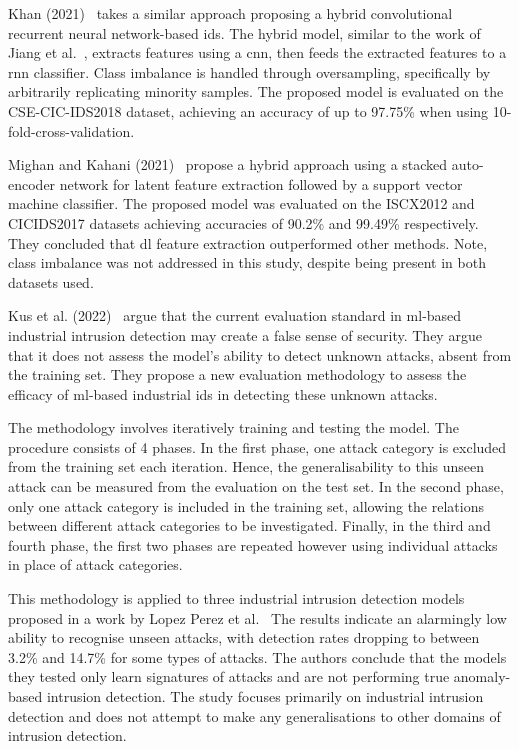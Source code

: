 Khan (2021)~\cite{Khan} takes a similar approach proposing a hybrid
convolutional recurrent neural network-based \gls{ids}. The hybrid model,
similar to the work of Jiang et al.~\cite{Jiang}, extracts features using a
\gls{cnn}, then feeds the extracted features to a \gls{rnn} classifier. Class
imbalance is handled through oversampling, specifically by arbitrarily
replicating minority samples. The proposed model is evaluated on the
CSE-CIC-IDS2018 dataset, achieving an accuracy of up to 97.75\% when using
10-fold-cross-validation.

Mighan and Kahani (2021)~\cite{Mighan} propose a hybrid approach using a
stacked auto-encoder network for latent feature extraction followed by a
support vector machine classifier. The proposed model was evaluated on the
ISCX2012 and CICIDS2017 datasets achieving accuracies of 90.2\% and 99.49\%
respectively. They concluded that \gls{dl} feature extraction outperformed
other methods. Note, class imbalance was not addressed in this study, despite
being present in both datasets used.

Kus et al. (2022)~\cite{Kus} argue that the current evaluation standard in
\gls{ml}-based industrial intrusion detection may create a false sense of
security. They argue that it does not assess the model's ability to detect
unknown attacks, absent from the training set. They propose a new evaluation
methodology to assess the efficacy of \gls{ml}-based industrial \gls{ids} in
detecting these unknown attacks.

The methodology involves iteratively training and testing the model. The
procedure consists of 4 phases. In the first phase, one attack category is
excluded from the training set each iteration. Hence, the generalisability to
this unseen attack can be measured from the evaluation on the test set. In the
second phase, only one attack category is included in the training set,
allowing the relations between different attack categories to be investigated.
Finally, in the third and fourth phase, the first two phases are repeated
however using individual attacks in place of attack categories.

This methodology is applied to three industrial intrusion detection models
proposed in a work by Lopez Perez et al.~\cite{Perez} The results indicate an
alarmingly low ability to recognise unseen attacks, with detection rates
dropping to between 3.2\% and 14.7\% for some types of attacks. The authors
conclude that the models they tested only learn signatures of attacks and are
not performing true anomaly-based intrusion detection. The study focuses
primarily on industrial intrusion detection and does not attempt to make any
generalisations to other domains of intrusion detection.

